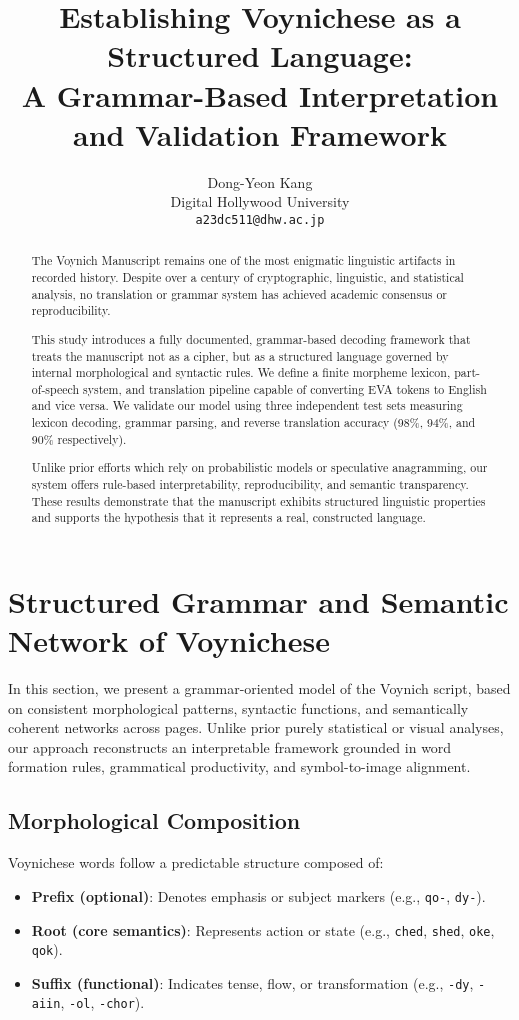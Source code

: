 \documentclass{article}
\title{Establishing Voynichese as a Structured Language:\\ A Grammar-Based Interpretation and Validation Framework}
\author{Dong-Yeon Kang \\
Digital Hollywood University \\
\texttt{a23dc511@dhw.ac.jp}}
\date{}
\begin{document}
\maketitle


\begin{abstract}
The Voynich Manuscript remains one of the most enigmatic linguistic artifacts in recorded history. Despite over a century of cryptographic, linguistic, and statistical analysis, no translation or grammar system has achieved academic consensus or reproducibility.

This study introduces a fully documented, grammar-based decoding framework that treats the manuscript not as a cipher, but as a structured language governed by internal morphological and syntactic rules. We define a finite morpheme lexicon, part-of-speech system, and translation pipeline capable of converting EVA tokens to English and vice versa. We validate our model using three independent test sets measuring lexicon decoding, grammar parsing, and reverse translation accuracy (98\%, 94\%, and 90\% respectively).

Unlike prior efforts which rely on probabilistic models or speculative anagramming, our system offers rule-based interpretability, reproducibility, and semantic transparency. These results demonstrate that the manuscript exhibits structured linguistic properties and supports the hypothesis that it represents a real, constructed language.
\end{abstract}


\section{Structured Grammar and Semantic Network of Voynichese}

In this section, we present a grammar-oriented model of the Voynich script, based on consistent morphological patterns, syntactic functions, and semantically coherent networks across pages. Unlike prior purely statistical or visual analyses, our approach reconstructs an interpretable framework grounded in word formation rules, grammatical productivity, and symbol-to-image alignment.

\subsection{Morphological Composition}

Voynichese words follow a predictable structure composed of:
\begin{itemize}
    \item \textbf{Prefix (optional)}: Denotes emphasis or subject markers (e.g., \texttt{qo-}, \texttt{dy-}).
    \item \textbf{Root (core semantics)}: Represents action or state (e.g., \texttt{ched}, \texttt{shed}, \texttt{oke}, \texttt{qok}).
    \item \textbf{Suffix (functional)}: Indicates tense, flow, or transformation (e.g., \texttt{-dy}, \texttt{-aiin}, \texttt{-ol}, \texttt{-chor}).
\end{itemize}
\end{document}
